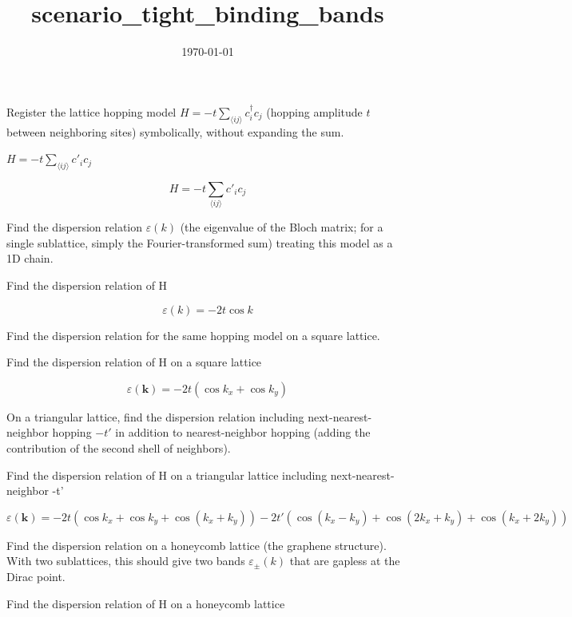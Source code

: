 \documentclass[dvipdfmx]{article}
\title{scenario\_tight\_binding\_bands}
\date{\today}
\begin{document}
\maketitle

Register the lattice hopping model $H=-t\sum_{\langle ij\rangle}c^\dagger_ic_j$ (hopping amplitude $t$ between neighboring sites) symbolically, without expanding the sum.

$H = -t \sum_{\langle i j \rangle} c'_i c_j$

\begin{equation}
  H = -t \sum_{\langle ij \rangle} c'_i c_j
  \label{eq:E1}
\end{equation}

Find the dispersion relation $\varepsilon(k)$ (the eigenvalue of the Bloch matrix; for a single sublattice, simply the Fourier-transformed sum) treating this model as a 1D chain.

Find the dispersion relation of H

\begin{equation}
  \varepsilon(k) = -2t \cos k
  \label{eq:E2}
\end{equation}

Find the dispersion relation for the same hopping model on a square lattice.

Find the dispersion relation of H on a square lattice

\begin{equation}
  \varepsilon(\mathbf{k}) = -2t \left( \cos k_x + \cos k_y \right)
  \label{eq:E3}
\end{equation}

On a triangular lattice, find the dispersion relation including next-nearest-neighbor hopping $-t'$ in addition to nearest-neighbor hopping (adding the contribution of the second shell of neighbors).

Find the dispersion relation of H on a triangular lattice including next-nearest-neighbor -t'

\begin{equation}
  \varepsilon(\mathbf{k}) = -2t \left( \cos k_x + \cos k_y + \cos(k_x + k_y) \right) -2t' \left( \cos(k_x - k_y) + \cos(2 k_x + k_y) + \cos(k_x + 2 k_y) \right)
  \label{eq:E4}
\end{equation}

Find the dispersion relation on a honeycomb lattice (the graphene structure). With two sublattices, this should give two bands $\varepsilon_\pm(k)$ that are gapless at the Dirac point.

Find the dispersion relation of H on a honeycomb lattice
\end{document}
